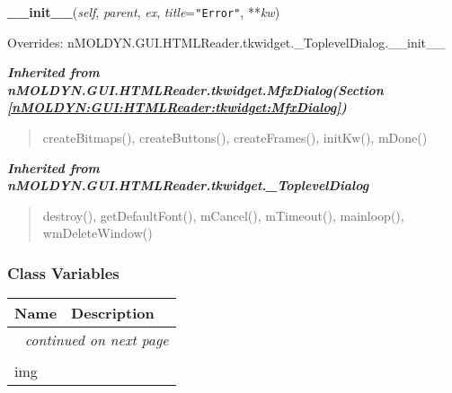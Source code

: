 \hspace{.8\funcindent}\begin{boxedminipage}{\funcwidth}

    \raggedright \textbf{\_\_init\_\_}(\textit{self}, \textit{parent}, \textit{ex}, \textit{title}={\tt "Error"}, **\textit{kw})

\setlength{\parskip}{2ex}
\setlength{\parskip}{1ex}
      Overrides: nMOLDYN.GUI.HTMLReader.tkwidget.\_ToplevelDialog.\_\_init\_\_

    \end{boxedminipage}


\large{\textbf{\textit{Inherited from nMOLDYN.GUI.HTMLReader.tkwidget.MfxDialog\textit{(Section \ref{nMOLDYN:GUI:HTMLReader:tkwidget:MfxDialog})}}}}

\begin{quote}
createBitmaps(), createButtons(), createFrames(), initKw(), mDone()
\end{quote}

\large{\textbf{\textit{Inherited from nMOLDYN.GUI.HTMLReader.tkwidget.\_ToplevelDialog}}}

\begin{quote}
destroy(), getDefaultFont(), mCancel(), mTimeout(), mainloop(), wmDeleteWindow()
\end{quote}


  \subsubsection{Class Variables}

    \vspace{-1cm}
\hspace{\varindent}\begin{longtable}{|p{\varnamewidth}|p{\vardescrwidth}|l}
\cline{1-2}
\cline{1-2} \centering \textbf{Name} & \centering \textbf{Description}& \\
\cline{1-2}
\endhead\cline{1-2}\multicolumn{3}{r}{\small\textit{continued on next page}}\\\endfoot\cline{1-2}
\endlastfoot\multicolumn{2}{|l|}{\textit{Inherited from nMOLDYN.GUI.HTMLReader.tkwidget.\_ToplevelDialog}}\\
\multicolumn{2}{|p{\varwidth}|}{\raggedright img}\\
\cline{1-2}
\end{longtable}

